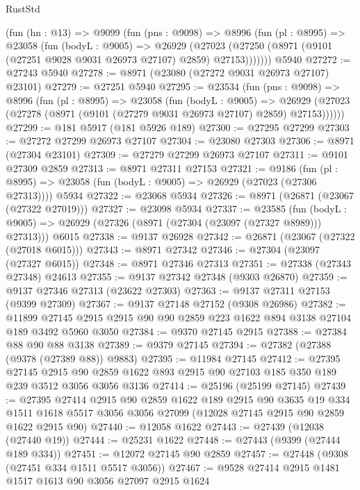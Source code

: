 \begin{lexlean}{RustStd}
\begin{coremodule}
    (fun (hn : @13) =>
    @9099
      (fun (pns : @9098) =>
      @8996
        (fun (pl : @8995) =>
        @23058
          (fun (bodyL : @9005) =>
          @26929
            (@27023 (@27250 (@8971 (@9101 (@27251 @9028 @9031 @26973 @27107) @2859) @27153)))))))
    @5940
@27272 := @27243 @5940
@27278 := @8971 (@23080 (@27272 @9031 @26973 @27107) @23101)
@27279 := @27251 @5940
@27295 := @23534
    (fun (pns : @9098) =>
    @8996
      (fun (pl : @8995) =>
      @23058
        (fun (bodyL : @9005) =>
        @26929 (@27023 (@27278 (@8971 (@9101 (@27279 @9031 @26973 @27107) @2859) @27153))))))
@27299 := @181 @5917 (@181 @5926 @189)
@27300 := @27295 @27299
@27303 := @27272 @27299 @26973 @27107
@27304 := @23080 @27303
@27306 := @8971 (@27304 @23101)
@27309 := @27279 @27299 @26973 @27107
@27311 := @9101 @27309 @2859
@27313 := @8971 @27311 @27153
@27321 := @9186
    (fun (pl : @8995) => @23058 (fun (bodyL : @9005) => @26929 (@27023 (@27306 @27313))))
    @5934
@27322 := @23068 @5934
@27326 := @8971 (@26871 (@23067 (@27322 @27019)))
@27327 := @23098 @5934
@27337 := @23585
    (fun (bodyL : @9005) => @26929 (@27326 (@8971 (@27304 (@23097 (@27327 @8989))) @27313)))
    @6015
@27338 := @9137 @26928
@27342 := @26871 (@23067 (@27322 (@27018 @6015)))
@27343 := @8971 @27342
@27346 := @27304 (@23097 (@27327 @6015))
@27348 := @8971 @27346 @27313
@27351 := @27338 (@27343 @27348) @24613
@27355 := @9137 @27342 @27348 (@9303 @26870)
@27359 := @9137 @27346 @27313 (@23622 @27303)
@27363 := @9137 @27311 @27153 (@9399 @27309)
@27367 := @9137 @27148 @27152 (@9308 @26986)
@27382 := @11899
    @27145
    @2915
    @2915
    @90
    @90
    @2859
    @223
    @1622
    @894
    @3138
    @27104
    @189
    @3492
    @5960
    @3050
@27384 := @9370 @27145 @2915
@27388 := @27384 @88 @90 @88 @3138
@27389 := @9379 @27145
@27394 := @27382 (@27388 (@9378 (@27389 @88)) @9883)
@27395 := @11984 @27145
@27412 := @27395
    @27145
    @2915
    @90
    @2859
    @1622
    @893
    @2915
    @90
    @27103
    @185
    @350
    @189
    @239
    @3512
    @3056
    @3056
    @3136
@27414 := @25196 (@25199 @27145)
@27439 := @27395
    @27414
    @2915
    @90
    @2859
    @1622
    @189
    @2915
    @90
    @3635
    @19
    @334
    @1511
    @1618
    @5517
    @3056
    @3056
    @27099
    (@12028 @27145 @2915 @90 @2859 @1622 @2915 @90)
@27440 := @12058 @1622
@27443 := @27439 (@12038 (@27440 @19))
@27444 := @25231 @1622
@27448 := @27443 (@9399 (@27444 @189 @334))
@27451 := @12072 @27145 @90 @2859
@27457 := @27448 (@9308 (@27451 @334 @1511 @5517 @3056))
@27467 := @9528 @27414 @2915 @1481 @1517 @1613 @90 @3056 @27097 @2915 @1624

\end{coremodule}
\end{lexlean}
